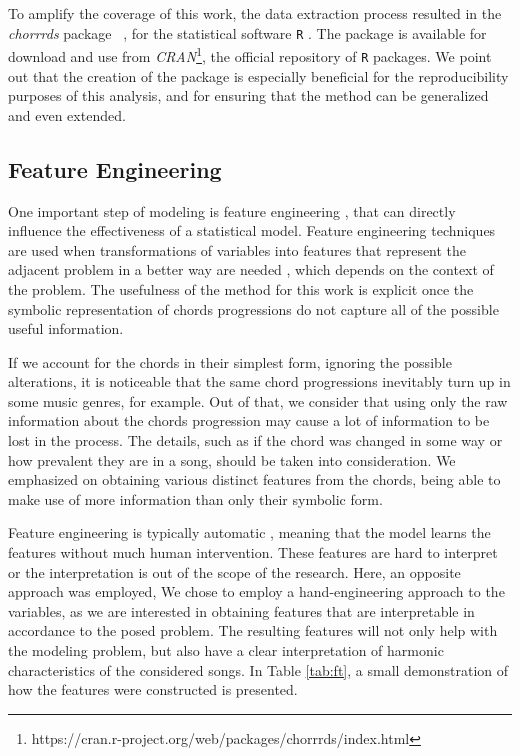 \documentclass[twocolumn]{article}
\begin{document}
To amplify the coverage of this work, the data extraction process resulted in the \textit{chorrrds} package ~\cite{chorrrds}, for the statistical software 
\texttt{R} \cite{Rsoftware}. 
The package is available for download and use from \textit{CRAN}\footnote{https://cran.r-project.org/web/packages/chorrrds/index.html}, the official repository of \texttt{R} packages. We point out that the creation of the package is especially beneficial for the
reproducibility purposes of this analysis, and 
for ensuring that the method can be generalized and
even extended. 

\subsection{Feature Engineering}\label{subsec:feat}

One important step of modeling is
feature engineering \cite{featureeng},
that can directly influence the
effectiveness of a statistical model. 
Feature engineering techniques are used
when transformations of variables into features
that represent the adjacent problem in a better way are needed \cite{nargesian2017learning}, which
depends on the context of the problem. The usefulness 
of the method for this work is explicit once the 
symbolic representation of chords progressions 
do not capture all of the possible useful information. 

If we account for the chords in their simplest form,
ignoring the possible alterations,
it is noticeable that the same chord progressions 
inevitably turn up in some music genres, for example.
Out of that, we consider that using only the
raw information about the chords progression
may cause a lot of information to be lost in the 
process. The details, such as if the chord was
changed in some way or how prevalent they are
in a song, should be taken into consideration. 
We emphasized on obtaining various distinct 
features from the chords, being able to make 
use of more information than only their symbolic form.

Feature engineering is typically automatic
\cite{nargesian2017learning}, meaning that
the model learns the features without much human intervention. These features
are hard to interpret or the interpretation 
is out of the scope of the research. 
Here, an opposite approach was employed,
We chose to employ a hand-engineering approach
to the variables, as we are interested
in obtaining features that are interpretable
in accordance to the posed problem. 
The resulting features will not only help 
with the modeling problem, but also
have a clear interpretation of 
harmonic characteristics of the considered
songs. In Table \ref{tab:ft}, a small demonstration 
of how the features were constructed is presented.
\end{document}
